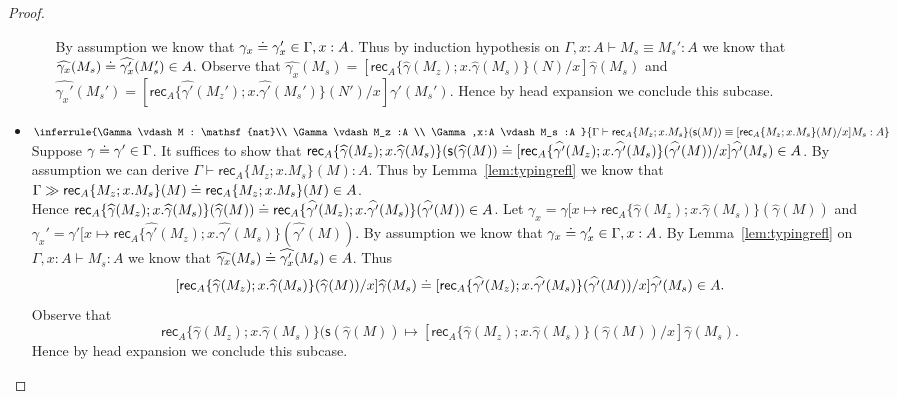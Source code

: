 \documentclass{article}
\newcommand{\G}{\Gamma}
\newcommand{\entails}{\vdash}
\newcommand{\tnat}{\mathsf{nat}}
\newcommand{\es}[1]{\mathsf{s}(#1)}
\newcommand{\erec}[5]{\mathsf{rec}_{#1}\{#2;#3.#4\}(#5)}
\newcommand{\stepto}{\mapsto}
\begin{document}
\begin{proof}
\begin{itemize}
\begin{itemize}
        By assumption we know that $\gamma_x \eeq \gamma_x' \in \G,x:A$.
        Thus by induction hypothesis on $\G,x:A \entails M_s \equiv M_s' : A$ we know that $\widehat{\gamma_x}(M_s) \doteq \widehat{\gamma_x'}(M_s') \in A$.
        Observe that $\widehat{\gamma_x}(M_s) = [\erec{A}{\widehat{\gamma}(M_z)}{x}{\widehat{\gamma}(M_s)}{N}/x]\widehat{\gamma}(M_s)$ and $\widehat{\gamma_x'}(M_s') = [\erec{A}{\widehat{\gamma'}(M_z')}{x}{\widehat{\gamma'}(M_s')}{N'}/x]\widehat{\gamma'}(M_s')$.
        Hence by head expansion we conclude this subcase.
    \end{itemize}
    \item $\inferrule{\G \entails M : \tnat \\ \G \entails M_z :A \\  \G,x:A \entails M_s :A }{\G \entails \erec{A}{M_z}{x}{M_s}{\es{M}} \equiv [\erec{A}{M_z}{x}{M_s}{M}/x]M_s : A}$\\
    Suppose $\gamma \eeq \gamma' \in \G$.
    It suffices to show that $\erec{A}{\widehat{\gamma}(M_z)}{x}{\widehat{\gamma}(M_s)}{\es{\widehat{\gamma}(M}} \eeq [\erec{A}{\widehat{\gamma'}(M_z)}{x}{\widehat{\gamma'}(M_s)}{\widehat{\gamma'}(M)}/x] \widehat{\gamma'}(M_s) \in A$.
    By assumption we can derive $\G \entails \erec{A}{M_z}{x}{M_s}{M} : A$.
    Thus by Lemma~\ref{lem:typingrefl} we know that $\G \gg \erec{A}{M_z}{x}{M_s}{M} \eeq \erec{A}{M_z}{x}{M_s}{M} \in A$.\\
    Hence $\erec{A}{\widehat{\gamma}(M_z)}{x}{\widehat{\gamma}(M_s)}{\widehat{\gamma}(M)} \eeq \erec{A}{\widehat{\gamma'}(M_z)}{x}{\widehat{\gamma'}(M_s)}{\widehat{\gamma'}(M)} \in A$.
    Let $\gamma_x = \gamma[x \mapsto \erec{A}{\widehat{\gamma}(M_z)}{x}{\widehat{\gamma}(M_s)}{\widehat{\gamma}(M)}$ and $\gamma_x' = \gamma'[x \mapsto \erec{A}{\widehat{\gamma'}(M_z)}{x}{\widehat{\gamma'}(M_s)}{\widehat{\gamma'}(M)}$.
    By assumption we know that $\gamma_x \eeq \gamma_x' \in \G,x:A$.
    By Lemma~\ref{lem:typingrefl} on $\G,x:A \entails M_s : A$ we know that $\widehat{\gamma_x}(M_s) \doteq \widehat{\gamma_x'}(M_s) \in A$.
    Thus
    \[
    [\erec{A}{\widehat{\gamma}(M_z)}{x}{\widehat{\gamma}(M_s)}{\widehat{\gamma}(M)}/x]\widehat{\gamma}(M_s) \eeq [\erec{A}{\widehat{\gamma'}(M_z)}{x}{\widehat{\gamma'}(M_s)}{\widehat{\gamma'}(M)}/x]\widehat{\gamma'}(M_s) \in A.
    \]
    Observe that
    \[
    \erec{A}{\widehat{\gamma}(M_z)}{x}{\widehat{\gamma}(M_s)}{\es{\widehat{\gamma}(M}} \stepto [\erec{A}{\widehat{\gamma}(M_z)}{x}{\widehat{\gamma}(M_s)}{\widehat{\gamma}(M)}/x]\widehat{\gamma}(M_s).
    \]
    Hence by head expansion we conclude this subcase.
\end{itemize}
\end{proof}
\end{document}
